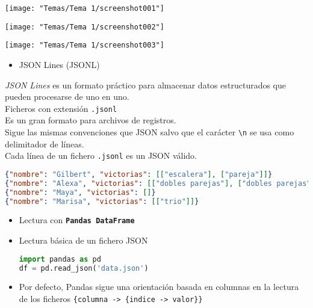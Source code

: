 \begin{center}
	\texttt{[image: "Temas/Tema 1/screenshot001"]}
	
	\texttt{[image: "Temas/Tema 1/screenshot002"]}
	
	\texttt{[image: "Temas/Tema 1/screenshot003"]}
\end{center}
\begin{itemize}[label=\color{red}\textbullet, leftmargin=*]
	\item \color{lightblue}JSON Lines (JSONL)
\end{itemize}
\textit{JSON Lines} es un formato práctico para almacenar datos estructurados que pueden procesarse de uno en uno.\\
Ficheros con extensión \texttt{.jsonl}\\
Es un gran formato para archivos de registros.\\
Sigue las mismas convenciones que JSON salvo que el carácter \texttt{\textbackslash n} se usa como delimitador de líneas.\\
Cada línea de un fichero \texttt{.jsonl} es un JSON válido.

\begin{lstlisting}[language=json]
{"nombre": "Gilbert", "victorias": [["escalera"], ["pareja"]]}
{"nombre": "Alexa", "victorias": [["dobles parejas"], ["dobles parejas"]]}
{"nombre": "Maya", "victorias": []}
{"nombre": "Marisa", "victorias": [["trio"]]}
\end{lstlisting}

\begin{itemize}[label=\color{red}\textbullet, leftmargin=*]
	\item \color{lightblue}Lectura con \textbf{\texttt{Pandas DataFrame}}
\end{itemize}
\begin{itemize}
	\item Lectura básica de un fichero JSON
	\begin{lstlisting}[language=python]
import pandas as pd
df = pd.read_json('data.json')
	\end{lstlisting}
	\item Por defecto, Pandas sigue una orientación basada en columnas en la lectura de los ficheros \texttt{\{columna -> \{indice -> valor\}\}}
\end{itemize}